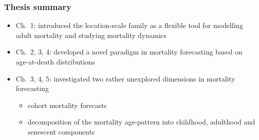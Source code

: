\documentclass[12pt, xcolor=table]{beamer}  %
\begin{document}
\begin{frame}[label=summary]\frametitle{Thesis summary}
	\begin{itemize}
		\setlength\itemsep{1.2em}
		\item[] {Ch.~1}: introduced the location-scale family as a flexible tool for modelling adult mortality and studying mortality dynamics \pause
		\item[] {Ch.~2, 3, 4}: developed a novel paradigm in mortality forecasting based on age-at-death distributions 
		\pause
		\item[] {Ch.~3, 4, 5}: investigated two rather unexplored dimensions in mortality forecasting
		\begin{itemize}
		\item cohort mortality forecasts
		\item decomposition of the mortality age-pattern into childhood, adulthood and senescent components
		\end{itemize}
	\end{itemize}
\end{frame}
\end{document}
